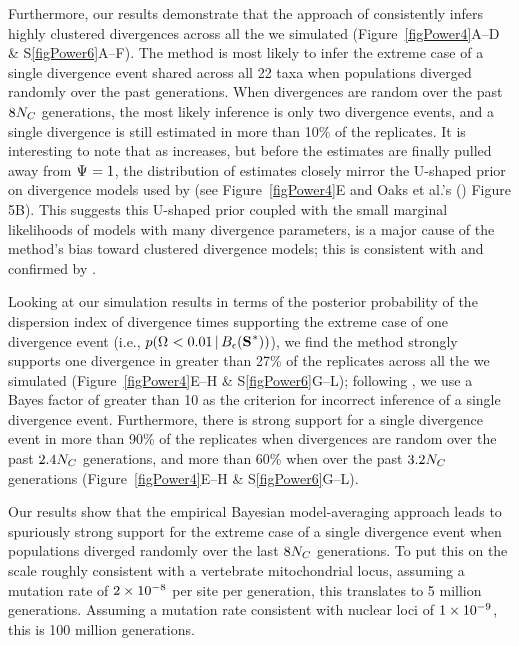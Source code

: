 Furthermore, our results demonstrate that the approach of \citet{Hickerson2013}
consistently infers highly clustered divergences across all the  we
simulated (Figure~\ref{figPower4}A--D \& S\ref{figPower6}A--F).
The method is most likely to infer the extreme case of a single divergence
event shared across all 22 taxa when populations diverged randomly over the
past \globalcoalunit generations.
When divergences are random over the past $8N_C$ generations, the
most likely inference is only two divergence events, and a single
divergence is still estimated in more than 10\% of the replicates.
It is interesting to note that as  increases, but before the
estimates are finally pulled away from $\Psi_{} = 1$, the distribution of
\numt{} estimates closely mirror the U-shaped prior on divergence models
used by \msb (see Figure~\ref{figPower4}E and Oaks et al.'s
(\citeyear{Oaks2012}) Figure 5B).
This suggests this U-shaped prior coupled with the small marginal likelihoods
of models with many divergence parameters, is a major cause of the method's
bias toward clustered divergence models; this is consistent with
\citet{Oaks2012} and confirmed by \citet{Oaks2014dpp}.

Looking at our simulation results in terms of the posterior probability of the
dispersion index of divergence times supporting the extreme case of one
divergence event (i.e., $p(\vmratio{} < 0.01 \given \ssSpace)$), we find the
method strongly supports one divergence in greater than 27\% of the replicates
across all the  we simulated (Figure~\ref{figPower4}E--H \&
S\ref{figPower6}G--L);
following \citet{Hickerson2013}, we use a Bayes factor of greater than 10 as
the criterion for incorrect inference of a single divergence event.
Furthermore, there is strong support for a single divergence event in
more than 90\% of the replicates when divergences are random over the past
$2.4N_C$ generations, and more than 60\% when over the past
$3.2N_C$ generations (Figure~\ref{figPower4}E--H \&
S\ref{figPower6}G--L).

Our results show that the empirical Bayesian model-averaging approach leads to
spuriously strong support for the extreme case of a single divergence event
when populations diverged randomly over the last $8N_C$ generations.
To put this on the scale roughly consistent with a vertebrate mitochondrial
locus, assuming a mutation rate of $2\times 10^{-8}$ per site per generation, this
translates to 5 million generations.
Assuming a mutation rate consistent with nuclear loci of $1\times 10^{-9}$, this is 100
million generations.

